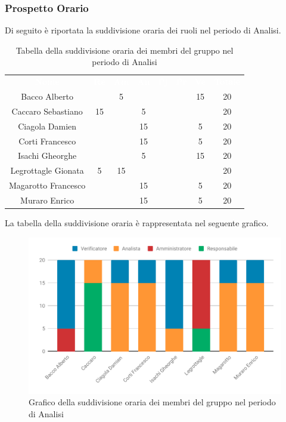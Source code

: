 \subsubsection{Prospetto Orario}
Di seguito è riportata la suddivisione oraria dei ruoli nel periodo di Analisi.




\begin{table}[H]	
	\begin{center}
	    \begin{tabular}{cccccccc}
			\rowcolor{greySWEight}
			\textcolor{white}{\textbf{Nome}} & \textcolor{white}{\textbf{Re}} & \textcolor{white}{\textbf{Am}} & \textcolor{white}{\textbf{An}} & \textcolor{white}{\textbf{Pj}} & \textcolor{white}{\textbf{Pr}} & \textcolor{white}{\textbf{Ve}} & \textcolor{white}{\textbf{Totale}}
			\\
			Bacco Alberto & & 5 & & & & 15 & 20 \\
			Caccaro Sebastiano & 15 & & 5 & & & & 20 \\
			Ciagola Damien & & & 15 & & & 5 & 20\\
			Corti Francesco & & & 15 & & & 5 & 20\\
			Isachi Gheorghe & & & 5 & & & 15 & 20\\
			Legrottagle Gionata & 5 & 15 & & & & & 20\\
			Magarotto Francesco & & & 15 & & & 5 & 20\\
			Muraro Enrico & & & 15 & & & 5 & 20\\
			\end{tabular}
	    \caption{Tabella della suddivisione oraria dei membri del gruppo nel periodo di Analisi} \label{tab:tabellaPersoneAnalisi} 
	\end{center}
\end{table}

La tabella della suddivisione oraria è rappresentata nel seguente grafico.
\begin{figure}[H]
	\includegraphics[width=1\linewidth]{Preventivo/grafici/AN1.pdf}
	\caption{Grafico della suddivisione oraria dei membri del gruppo nel periodo di Analisi}
\end{figure}

